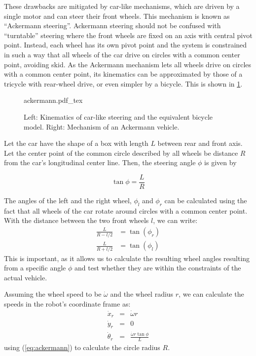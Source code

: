 These drawbacks are mitigated by car-like mechanisms, which are driven by a single motor and can steer their front wheels. This mechanism is known as ``Ackermann steering''. 
Ackermann steering should not be confused with ``turntable'' steering  where the front wheels are fixed on an axis with central pivot point.
Instead, each wheel has its own pivot point and the system is constrained in such a way that all wheels of the car drive on circles with a common center point, avoiding skid.
As the Ackermann mechanism lets all wheels drive on circles with a common center point, its kinematics can be approximated by those of a tricycle with rear-wheel drive, or even simpler by a bicycle. This is shown in \cref{fig:ackermann}.

\begin{figure}[htb!]
    \centering
    \def\svgwidth{0.9\textwidth}
    {ackermann.pdf_tex}
    \caption{Left: Kinematics of car-like steering and the equivalent bicycle model. Right: Mechanism of an Ackermann vehicle.}
    \label{fig:ackermann}
\end{figure}

Let the car have the shape of a box with length $L$ between rear and front axis. Let the center point of the common circle described by all wheels be distance $ R$ from the car's longitudinal center line. Then, the steering angle $ \phi$ is given by

\begin{equation}\label{eq:ackermann}
\tan \phi = \frac{L}{R}
\end{equation}

The angles of the left and the right wheel, $ \phi_l$ and $ \phi_r$ can be calculated using the fact that all wheels of the car rotate around circles with a common center point. With the distance between the two front wheels $l$, we can write:
\begin{eqnarray}
\frac{L}{R-l/2}&=\tan{(\phi_r)} \nonumber \\
\frac{L}{R+l/2}&=\tan{(\phi_l)}
\end{eqnarray}
This is important, as it allows us to calculate the resulting wheel angles resulting from a specific angle $\phi$ and test whether they are within the constraints of the actual vehicle.

Assuming the wheel speed to be $\dot{\omega}$ and the wheel radius $r$, we can calculate the speeds in the robot's coordinate frame as:
\begin{eqnarray}
\dot{x}_r&=&\dot{\omega}r \nonumber \\
\dot{y}_r&=&0\\
\dot{\theta}_r&=&\frac{\dot{\omega}r\tan\phi}{L} \nonumber
\end{eqnarray}
using (\ref{eq:ackermann}) to calculate the circle radius $R$.

